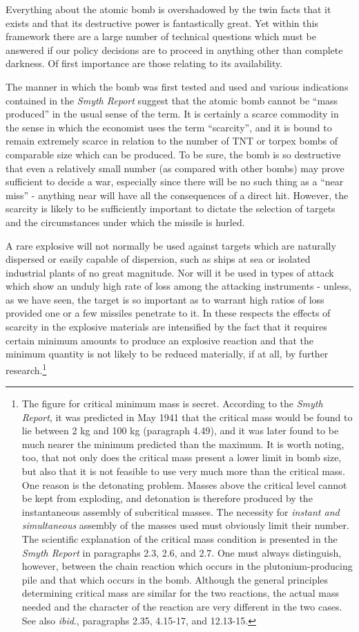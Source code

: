 Everything about the atomic bomb is overshadowed by the twin facts that it exists and that its destructive power is fantastically great. Yet within this framework there are a large number of technical questions which must be answered if our policy decisions are to proceed in anything other than complete darkness. Of first importance are those relating to its availability.

The manner in which the bomb was first tested and used and various indications contained in the \emph{Smyth Report} suggest that the atomic bomb cannot be ``mass produced'' in the usual sense of the term. It is certainly a scarce commodity in the sense in which the economist uses the term ``scarcity'', and it is bound to remain extremely scarce in relation to the number of TNT or torpex bombs of comparable size which can be produced. To be sure, the bomb is so destructive that even a relatively small number (as compared with other bombs) may prove sufficient to decide a war, especially since there will be no such thing as a ``near miss'' - anything near will have all the consequences of a direct hit. However, the scarcity is likely to be sufficiently important to dictate the selection of targets and the circumstances under which the missile is hurled.

A rare explosive will not normally be used against targets which are naturally dispersed or easily capable of dispersion, such as ships at sea or isolated industrial plants of no great magnitude. Nor will it be used in types of attack which show an unduly high rate of loss among the attacking instruments - unless, as we have seen, the target is so important as to warrant high ratios of loss provided one or a few missiles penetrate to it. In these respects the effects of scarcity in the explosive materials are intensified by the fact that it requires certain minimum amounts to produce an explosive reaction and that the minimum quantity is not likely to be reduced materially, if at all, by further research.\footnote{The figure for critical minimum mass is secret. According to the \textit{Smyth Report}, it was predicted in May 1941 that the critical mass would be found to lie between 2 kg and 100 kg (paragraph 4.49), and it was later found to be much nearer the minimum predicted than the maximum. It is worth noting, too, that not only does the critical mass present a lower limit in bomb size, but also that it is not feasible to use very much more than the critical mass. One reason is the detonating problem. Masses above the critical level cannot be kept from exploding, and detonation is therefore produced by the instantaneous assembly of subcritical masses. The necessity for \emph{instant and simultaneous} assembly of the masses used must obviously limit their number. The scientific explanation of the critical mass condition is presented in the \textit{Smyth Report} in paragraphs 2.3, 2.6, and 2.7. One must always distinguish, however, between the chain reaction which occurs in the plutonium-producing pile and that which occurs in the bomb. Although the general principles determining critical mass are similar for the two reactions, the actual mass needed and the character of the reaction are very different in the two cases. See also \textit{ibid}., paragraphs 2.35, 4.15-17, and 12.13-15.}

